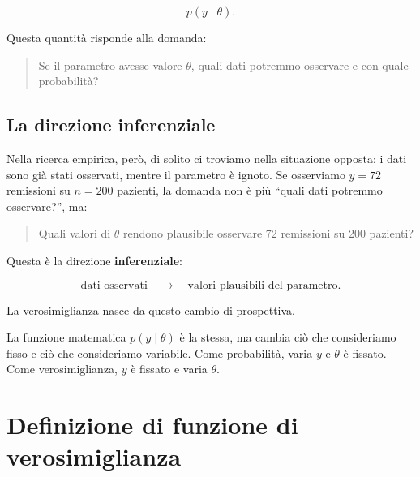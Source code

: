 \documentclass[
  italian,
  letterpaper,
  a4paper,
  11pt,
  open=any]{scrbook}
\theoremstyle{plain}
\theoremstyle{definition}
\theoremstyle{definition}
\theoremstyle{remark}
\begin{document}
\[
p(y \mid \theta).
\]

Questa quantità risponde alla domanda:

\begin{quote}
Se il parametro avesse valore \(\theta\), quali dati potremmo osservare
e con quale probabilità?
\end{quote}

\subsection{La direzione inferenziale}\label{la-direzione-inferenziale}

Nella ricerca empirica, però, di solito ci troviamo nella situazione
opposta: i dati sono già stati osservati, mentre il parametro è ignoto.
Se osserviamo \(y = 72\) remissioni su \(n = 200\) pazienti, la domanda
non è più ``quali dati potremmo osservare?'', ma:

\begin{quote}
Quali valori di \(\theta\) rendono plausibile osservare 72 remissioni su
200 pazienti?
\end{quote}

Questa è la direzione \textbf{inferenziale}:

\[
\text{dati osservati} \quad \longrightarrow \quad \text{valori plausibili del parametro}.
\]

La verosimiglianza nasce da questo cambio di prospettiva.

\begin{tcolorbox}[enhanced jigsaw, arc=.35mm, bottomrule=.15mm, bottomtitle=1mm, breakable, colback=white, colbacktitle=quarto-callout-note-color!10!white, colframe=quarto-callout-note-color-frame, coltitle=black, left=2mm, leftrule=.75mm, opacityback=0, opacitybacktitle=0.6, rightrule=.15mm, title=\textcolor{quarto-callout-note-color}{\faInfo}\hspace{0.5em}{Idea chiave}, titlerule=0mm, toprule=.15mm, toptitle=1mm]

La funzione matematica \(p(y \mid \theta)\) è la stessa, ma cambia ciò
che consideriamo fisso e ciò che consideriamo variabile. Come
probabilità, varia \(y\) e \(\theta\) è fissato. Come verosimiglianza,
\(y\) è fissato e varia \(\theta\).

\end{tcolorbox}

\section{Definizione di funzione di
verosimiglianza}\label{sec-likelihood-definition}
\end{document}
